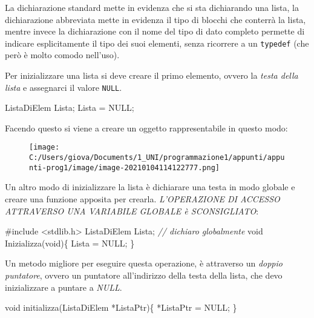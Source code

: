 \documentclass[
]{article}
\newenvironment{Shaded}{}{}
\newcommand{\CommentTok}[1]{\textcolor[rgb]{0.38,0.63,0.69}{\textit{#1}}}
\newcommand{\DataTypeTok}[1]{\textcolor[rgb]{0.56,0.13,0.00}{#1}}
\newcommand{\ImportTok}[1]{#1}
\newcommand{\NormalTok}[1]{#1}
\newcommand{\PreprocessorTok}[1]{\textcolor[rgb]{0.74,0.48,0.00}{#1}}
\begin{document}
La dichiarazione standard mette in evidenza che si sta dichiarando una
lista, la dichiarazione abbreviata mette in evidenza il tipo di blocchi
che conterrà la lista, mentre invece la dichiarazione con il nome del
tipo di dato completo permette di indicare esplicitamente il tipo dei
suoi elementi, senza ricorrere a un \texttt{typedef} (che però è molto
comodo nell'uso).

Per inizializzare una lista si deve creare il primo elemento, ovvero la
\emph{testa della lista} e assegnarci il valore \texttt{NULL}.

\begin{Shaded}
\begin{Highlighting}[]
\NormalTok{ListaDiElem Lista;}
\NormalTok{Lista = NULL; }
\end{Highlighting}
\end{Shaded}

Facendo questo si viene a creare un oggetto rappresentabile in questo
modo:

\begin{figure}
\centering
\texttt{[image: C:/Users/giova/Documents/1\_UNI/programmazione1/appunti/appunti-prog1/image/image-20210104114122777.png]}
\caption{}
\end{figure}

Un altro modo di inizializzare la lista è dichiarare una testa in modo
globale e creare una funzione apposita per crearla. \emph{L'OPERAZIONE
DI ACCESSO ATTRAVERSO UNA VARIABILE GLOBALE è SCONSIGLIATO}:

\begin{Shaded}
\begin{Highlighting}[]
\PreprocessorTok{\#include }\ImportTok{\textless{}stdlib.h\textgreater{}}
\NormalTok{ListaDiElem Lista; }\CommentTok{// dichiaro globalmente}
\DataTypeTok{void}\NormalTok{ Inizializza(}\DataTypeTok{void}\NormalTok{)\{}
\NormalTok{    Lista = NULL;}
\NormalTok{\}}
\end{Highlighting}
\end{Shaded}

Un metodo migliore per eseguire questa operazione, è attraverso un
\emph{doppio puntatore}, ovvero un puntatore all'indirizzo della testa
della lista, che devo inizializzare a puntare a \emph{NULL}.

\begin{Shaded}
\begin{Highlighting}[]
\DataTypeTok{void}\NormalTok{ initializza(ListaDiElem *ListaPtr)\{}
\NormalTok{    *ListaPtr = NULL;    }
\NormalTok{\}}
\end{Highlighting}
\end{Shaded}
\end{document}
